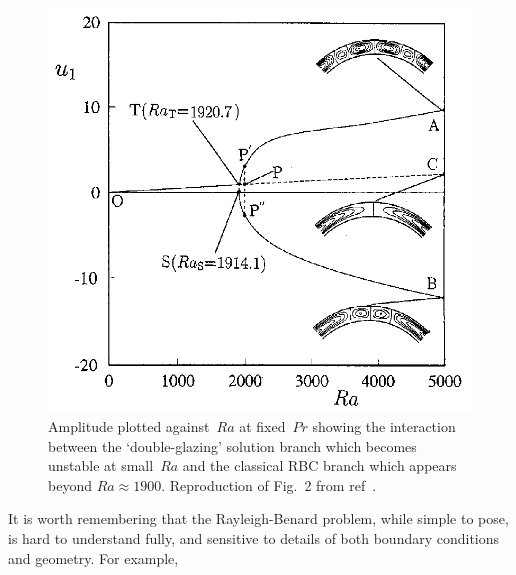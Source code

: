 \begin{figure}
\centerline{\includegraphics[width=13cm]{../png/Mi01f2c}}
\caption{Amplitude plotted against~$Ra$ at fixed~$Pr$ showing the
interaction between the `double-glazing' solution branch which becomes
unstable at small~$Ra$ and the classical RBC branch which appears beyond $Ra\approx1900$.
Reproduction of Fig.~2 from ref~\cite{Mi01Tran}.  \label{fig:Mi01Tran}}
\end{figure}
It is worth remembering that the Rayleigh-Benard problem, while simple to pose, is hard to
understand fully, and sensitive to details of both boundary conditions and geometry.
For example, 
